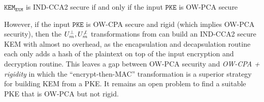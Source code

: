 \documentclass[floatrow,journal=tches,submission]{iacrtrans}
\newcommand{\pke}{\texttt{PKE}}
\newcommand{\kem}{\texttt{KEM}}
\newcommand{\etm}{\texttt{EtM}}  %
\begin{document}
\begin{lemma}
    $\kem_\etm$ is IND-CCA2 secure if and only if the input $\pke$ is OW-PCA secure
\end{lemma}

However, if the input $\pke$ is OW-CPA secure and rigid (which implies OW-PCA security), then the $U^\bot_m, U^{\not\bot}_m$ transformations from \cite{hofheinz2017modular} can build an IND-CCA2 secure KEM with almost no overhead, as the encapsulation and decapsulation routine each only adds a hash of the plaintext on top of the input encryption and decryption routine. This leaves a gap between OW-PCA security and \emph{OW-CPA + rigidity} in which the ``encrypt-then-MAC'' transformation is a superior strategy for building KEM from a PKE. It remains an open problem to find a suitable PKE that is OW-PCA but not rigid.



\end{document}
